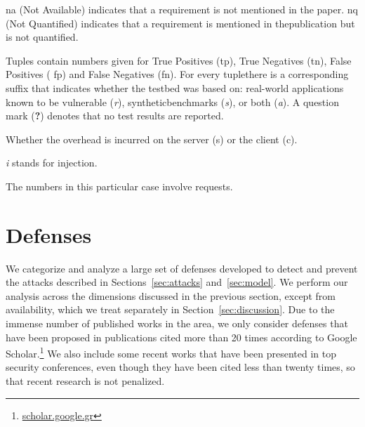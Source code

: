 \documentclass[10pt,journal,compsoc]{IEEEtran}
\begin{document}
\begin{table}[t]
\begin{threeparttable}
\begin{small}
\begin{tablenotes}
  \begin{footnotesize}
        \item[1] {\sc na} (Not Available) indicates that a requirement is not mentioned in the paper.
  {\sc nq} (Not Quantified) indicates that a requirement is mentioned in the\newline publication
  but is not quantified.
      \item[2] Tuples contain numbers given for True Positives
        ({\sc tp}), True Negatives ({\sc tn}), False Positives ({\sc
          fp}) and False Negatives ({\sc fn}). For every tuple\newline there is a corresponding suffix that indicates whether the testbed was
  based on: real-world applications known to be vulnerable ({\it r}),
  synthetic\newline benchmarks ({\it s}), or both ({\it a}).
  A question mark ({\bf ?}) denotes that no test results are reported.
    \item[3] Whether the overhead is incurred on the server ({\sc s}) or the client ({\sc c}). 
    \item[4] {\it i} stands for injection.
    \item[5] The numbers in this particular case involve requests.
  \end{footnotesize}
    \end{tablenotes}
    \end{small}
    \end{threeparttable}
\end{table}

\section{Defenses}
\label{sec:defs}

We categorize and analyze a large set of defenses developed to detect
and prevent
the attacks described in Sections~\ref{sec:attacks} and~\ref{sec:model}.
We perform our analysis across
the dimensions discussed in the previous section,
except from availability, which we treat
separately in Section~\ref{sec:discussion}.
Due to the immense number of published works in the area, we only consider
defenses that have been proposed in publications cited more than
20 times according to Google Scholar.\footnote{\url{scholar.google.gr}}
We also include some recent works that have been
presented in top security conferences, even though they have been
cited less than twenty times, so that recent research is not penalized.
\end{document}
